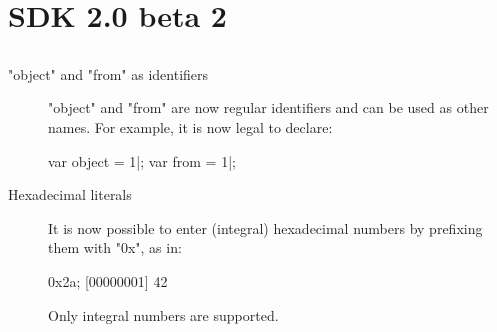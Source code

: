 \section{\urbi SDK 2.0 beta 2}

\subsection{\us}

\begin{description}
\item["object" and "from" as identifiers]

"object" and "from" are now regular identifiers and can be used as
other names.  For example, it is now legal to declare:

\begin{urbiscript}
var object = 1|;
var from = 1|;
\end{urbiscript}

\item[Hexadecimal literals]
  It is now possible to enter (integral) hexadecimal numbers by
  prefixing them with "0x", as in:

\begin{urbiscript}
0x2a;
[00000001] 42
\end{urbiscript}

Only integral numbers are supported.

\end{description}


